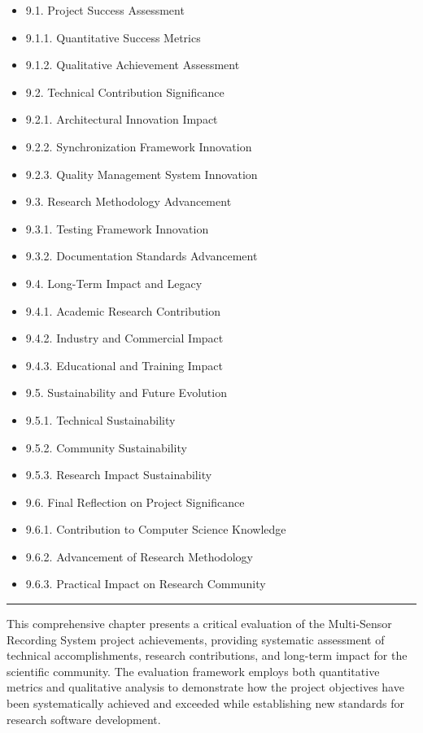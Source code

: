 \documentclass[12pt,a4paper]{report}
\begin{document}
\begin{itemize}
\item 9.1. Project Success Assessment
\item 9.1.1. Quantitative Success Metrics
\item 9.1.2. Qualitative Achievement Assessment
\item 9.2. Technical Contribution Significance
\item 9.2.1. Architectural Innovation Impact
\item 9.2.2. Synchronization Framework Innovation
\item 9.2.3. Quality Management System Innovation
\item 9.3. Research Methodology Advancement
\item 9.3.1. Testing Framework Innovation
\item 9.3.2. Documentation Standards Advancement
\item 9.4. Long-Term Impact and Legacy
\item 9.4.1. Academic Research Contribution
\item 9.4.2. Industry and Commercial Impact
\item 9.4.3. Educational and Training Impact
\item 9.5. Sustainability and Future Evolution
\item 9.5.1. Technical Sustainability
\item 9.5.2. Community Sustainability
\item 9.5.3. Research Impact Sustainability
\item 9.6. Final Reflection on Project Significance
\item 9.6.1. Contribution to Computer Science Knowledge
\item 9.6.2. Advancement of Research Methodology
\item 9.6.3. Practical Impact on Research Community

\end{itemize}
\hrule

This comprehensive chapter presents a critical evaluation of the Multi-Sensor Recording System project achievements,
providing systematic assessment of technical accomplishments, research contributions, and long-term impact for the
scientific community. The evaluation framework employs both quantitative metrics and qualitative analysis to demonstrate
how the project objectives have been systematically achieved and exceeded while establishing new standards for research
software development.
\end{document}

